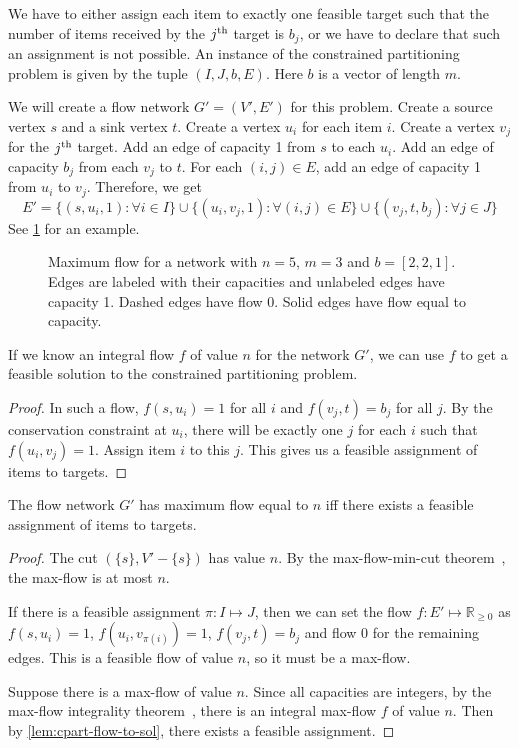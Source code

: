 We have to either assign each item to exactly one feasible target such that the
number of items received by the $j^{\textrm{th}}$ target is $b_j$, or we have to declare
that such an assignment is not possible.
An instance of the constrained partitioning problem is given by the tuple $(I, J, b, E)$.
Here $b$ is a vector of length $m$.

We will create a flow network $G' = (V', E')$ for this problem.
Create a source vertex $s$ and a sink vertex $t$. Create a vertex $u_i$ for each item $i$.
Create a vertex $v_j$ for the $j^{\textrm{th}}$ target.
Add an edge of capacity 1 from $s$ to each $u_i$.
Add an edge of capacity $b_j$ from each $v_j$ to $t$.
For each $(i, j) \in E$, add an edge of capacity 1 from $u_i$ to $v_j$.
Therefore, we get
\[ E' = \{(s, u_i, 1): \forall i \in I\}
\cup \{(u_i, v_j, 1): \forall (i, j) \in E\}
\cup \{(v_j, t, b_j): \forall j \in J\} \]
See \cref{fig:cpart-flow} for an example.

\begin{figure}[htb]
\centering

\caption[Maximum flow network for the constrained partitioning problem]%
{Maximum flow for a network with $n=5$, $m=3$ and $b=[2,2,1]$.
Edges are labeled with their capacities and unlabeled edges have capacity 1.
Dashed edges have flow 0. Solid edges have flow equal to capacity.}
\label{fig:cpart-flow}
\end{figure}

\begin{lemma}
\label{lem:cpart-flow-to-sol}
If we know an integral flow $f$ of value $n$ for the network $G'$,
we can use $f$ to get a feasible solution to the constrained partitioning problem.
\end{lemma}
\begin{proof}
In such a flow, $f(s, u_i) = 1$ for all $i$ and $f(v_j, t) = b_j$ for all $j$.
By the conservation constraint at $u_i$, there will be exactly one $j$ for each $i$
such that $f(u_i, v_j) = 1$. Assign item $i$ to this $j$.
This gives us a feasible assignment of items to targets.
\end{proof}

\begin{lemma}
\label{lem:cpart-flow-iff}
The flow network $G'$ has maximum flow equal to $n$ iff there exists a feasible
assignment of items to targets.
\end{lemma}
\begin{proof}
The cut $(\{s\}, V'-\{s\})$ has value $n$.
By the max-flow-min-cut theorem~\cite[Theorem 26.6]{clrs:max-flow}, the max-flow is at most $n$.

If there is a feasible assignment $\pi: I \mapsto J$, then we can set the flow
$f: E' \mapsto \mathbb{R}_{\ge 0}$ as $f(s, u_i) = 1$,
$f(u_i, v_{\pi(i)}) = 1$, $f(v_j, t) = b_j$ and flow 0 for the remaining edges.
This is a feasible flow of value $n$, so it must be a max-flow.

Suppose there is a max-flow of value $n$. Since all capacities are integers,
by the max-flow integrality theorem~\cite[Theorem 26.10]{clrs:max-flow},
there is an integral max-flow $f$ of value $n$.
Then by \cref{lem:cpart-flow-to-sol}, there exists a feasible assignment.
\end{proof}


